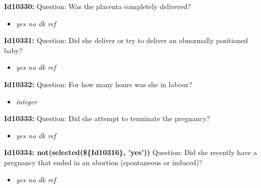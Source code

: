\documentclass{article}%
\begin{document}
\textbf{Id10330: \newline%
}%
Question: Was the placenta completely delivered?\newline%
%
\begin{itemize}%
\item%
\textit{yes\newline%
 no\newline%
 dk\newline%
 ref\newline%
}%
\end{itemize}%
\textbf{Id10331: \newline%
}%
Question: Did she deliver or try to deliver an abnormally positioned baby?\newline%
%
\begin{itemize}%
\item%
\textit{yes\newline%
 no\newline%
 dk\newline%
 ref\newline%
}%
\end{itemize}%
\textbf{Id10332: \newline%
}%
Question: For how many hours was she in labour?\newline%
%
\begin{itemize}%
\item%
\textit{integer\newline%
}%
\end{itemize}%
\textbf{Id10333: \newline%
}%
Question: Did she attempt to terminate the pregnancy?\newline%
%
\begin{itemize}%
\item%
\textit{yes\newline%
 no\newline%
 dk\newline%
 ref\newline%
}%
\end{itemize}%
\textbf{Id10334: not(selected(\$\{Id10316\}, 'yes'))\newline%
}%
Question: Did she recently have a pregnancy that ended in an abortion (spontaneous or induced)?\newline%
%
\begin{itemize}%
\item%
\textit{yes\newline%
 no\newline%
 dk\newline%
 ref\newline%
}%
\end{itemize}%
\end{document}
